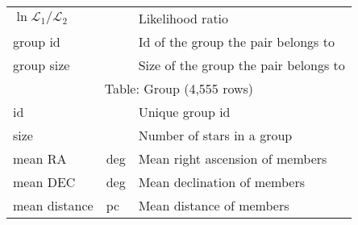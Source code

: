 \begin{table}[htb]
\begin{tabular}{l|l|l}
$\ln\mathcal{L}_1/\mathcal{L}_2$ &        & Likelihood ratio                    \\
group id                         &        & Id of the group the pair belongs to \\
group size                       &        & Size of the group the pair belongs to \\
\hline
\multicolumn{3}{c}{Table: Group (4,555 rows)}                                         \\
\hline
id            &        & Unique group id                     \\
size          &        & Number of stars in a group          \\
mean RA       &  deg   & Mean right ascension of members     \\
mean DEC      &  deg   & Mean declination of members     \\
mean distance &  pc    & Mean distance of members     \\
\hline\hline
\end{tabular}
\end{table}
